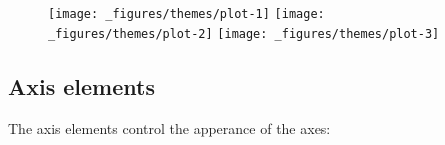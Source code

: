 \begin{Shaded}
\begin{Highlighting}[]
\StringTok{ }\NormalTok{(} \NormalTok{(} \NormalTok{, } \NormalTok{))}
\StringTok{ }\NormalTok{(}
   \NormalTok{(} \NormalTok{, } \NormalTok{),}
   \NormalTok{(}\NormalTok{, }\NormalTok{, }\NormalTok{, }\NormalTok{)}
\NormalTok{)}
\StringTok{ }\NormalTok{(} \NormalTok{(} \NormalTok{))}
\end{Highlighting}
\end{Shaded}

\begin{figure}[H]
  \texttt{[image: \_figures/themes/plot-1]}%
  \texttt{[image: \_figures/themes/plot-2]}%
  \texttt{[image: \_figures/themes/plot-3]}
\end{figure}

\subsection{Axis elements}\label{sub:theme-axis}

 

The axis elements control the apperance of the axes:


